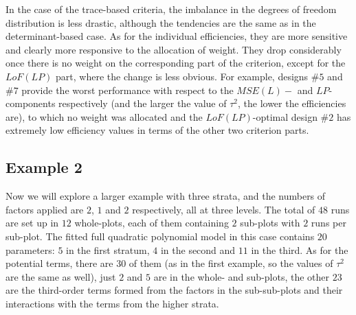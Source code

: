 In the case of the trace-based criteria, the imbalance in the degrees of freedom distribution is less drastic, although the tendencies are the same as in the determinant-based case. As for the individual efficiencies, they are more sensitive and clearly more responsive to the allocation of weight. They drop considerably once there is no weight on the corresponding part of the criterion, except for the $LoF(LP)$ part, where the change is less obvious. For example, designs \#$5$ and \#$7$ provide the worst performance with respect to the $MSE(L)-$ and $LP$-components respectively (and the larger the value of $\tau^2$, the lower the efficiencies are), to which no weight was allocated and the $LoF(LP)$-optimal design \#$2$ has extremely low efficiency values in terms of the other two criterion parts. 


\subsection{Example 2}

Now we will explore a larger example with three strata, and the numbers of factors applied are $2$, $1$ and $2$ respectively, all at three levels. The total of $48$ runs are set up in $12$ whole-plots, each of them containing $2$ sub-plots with $2$ runs per sub-plot. The fitted full quadratic polynomial model in this case contains $20$ parameters: $5$ in the first stratum, $4$ in the second and $11$ in the third. As for the potential terms, there are $30$ of them (as in the first example, so the values of $\tau^2$ are the same as well), just $2$ and $5$ are  in the whole- and sub-plots, the other $23$ are the third-order terms formed from the factors in the sub-sub-plots and their interactions with the terms from the higher strata.

